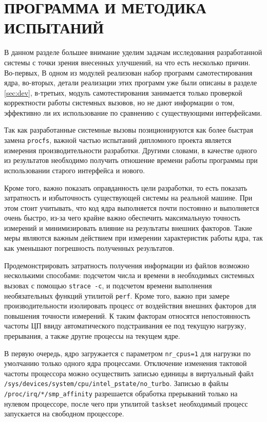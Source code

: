 \pagebreak
\section{ПРОГРАММА И МЕТОДИКА ИСПЫТАНИЙ}
\label{sec:testing}

В данном разделе большее внимание уделим задачам исследования разработанной
системы с точки зрения внесенных улучшений, на что есть несколько причин.
Во-первых, В одном из модулей реализован набор программ самотестирования
ядра, во-вторых, детали реализации этих программ уже были описаны в разделе
\ref{sec:dev}, в-третьих, модуль самотестирования занимается только проверкой
корректности работы системных вызовов, но не дают информации о том, эффективно
ли их использование по сравнению с существующими интерфейсами.

Так как разработанные системные вызовы позиционируются как более быстрая замена
\texttt{procfs}, важной частью испытаний дипломного проекта является измерения
производительности разработки. Другими словами, в качестве одного из результатов
необходимо получить отношение времени работы программы при использовании старого
интерфейса и нового.

Кроме того, важно показать оправданность цели разработки, то есть показать
затратность и избыточность существующей системы на реальной машине. При этом
стоит учитывать, что код ядра выполняется почти постоянно и выполняется очень
быстро, из-за чего крайне важно обеспечить максимальную точность измерений и
минимизировать влияние на результаты внешних факторов. Такие меры являются
важным действием при измерении характеристик работы ядра, так как уменьшают
погрешность полученных результатов.

Продемонстрировать затратность получения информации из файлов возможно несколькими
способами: подсчетом числа и времени в необходимых системных вызовах с помощью
\texttt{strace -c}, и подсчетом времени выполнения необязательных функций
утилитой \texttt{perf}. Кроме того, важно при замере производительности
изолировать процесс от воздействия внешних факторов для повышения точности
измерений. К таким факторам относятся непостоянность частоты ЦП ввиду
автоматического подстраивания ее под текущую нагрузку, прерывания, а также
другие процессы на текущем ядре.

В первую очередь, ядро загружается с параметром \texttt{nr\_cpus=1} для нагрузки
по умолчанию только одного ядра процессами.
Отключение изменения тактовой частоты процессора можно осуществить записью
единицы в виртуальный файл
\texttt{/sys/devices/system/cpu/intel\_pstate/no\_turbo}. Записью в файлы
\texttt{/proc/irq/*/smp\_affinity} разрешается обработка прерываний только на
нулевом процессоре, после чего при утилитой \texttt{taskset} необходимый
процесс запускается на свободном процессоре.

